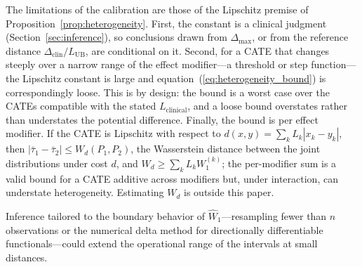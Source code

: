 \documentclass[AMA,Times1COL]{WileyNJDv5}
\begin{document}
The limitations of the calibration are those of the Lipschitz premise of Proposition~\ref{prop:heterogeneity}. First, the constant is a clinical judgment (Section~\ref{sec:inference}), so conclusions drawn from $\Delta_{\max}$, or from the reference distance $\Delta_{\text{clin}} / L_{\text{UB}}$, are conditional on it. Second, for a CATE that changes steeply over a narrow range of the effect modifier---a threshold or step function---the Lipschitz constant is large and equation~(\ref{eq:heterogeneity_bound}) is correspondingly loose. This is by design: the bound is a worst case over the CATEs compatible with the stated $L_{\text{clinical}}$, and a loose bound overstates rather than understates the potential difference. %
Finally, the bound is per effect modifier. If the CATE is Lipschitz with respect to $d(x, y) = \sum_k L_k |x_k - y_k|$, then $|\bar{\tau}_1 - \bar{\tau}_2| \leq W_d(P_1, P_2)$, the Wasserstein distance between the joint distributions under cost $d$, and $W_d \geq \sum_k L_k W_1^{(k)}$; the per-modifier sum is a valid bound for a CATE additive across modifiers but, under interaction, can understate heterogeneity. Estimating $W_d$ is outside this paper.

Inference tailored to the boundary behavior of $\widehat{W}_1$---resampling fewer than $n$ observations\cite{bickel1997} or the numerical delta method for directionally differentiable functionals\cite{hong2018}---could extend the operational range of the intervals at small distances.
\end{document}
